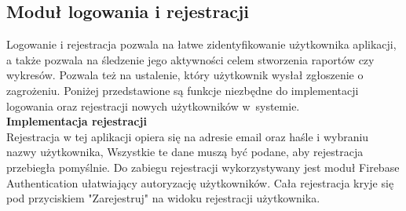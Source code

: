 \subsection{Moduł logowania i rejestracji}
Logowanie i rejestracja pozwala na łatwe zidentyfikowanie użytkownika aplikacji, a także pozwala na śledzenie jego aktywności celem stworzenia raportów czy wykresów. Pozwala też na ustalenie, który użytkownik wysłał zgłoszenie o zagrożeniu. Poniżej przedstawione są funkcje niezbędne do implementacji logowania oraz rejestracji nowych użytkowników w~systemie.
\\

\noindent
\textbf{Implementacja rejestracji}\\
\indent Rejestracja w tej aplikacji opiera się na adresie email oraz haśle i wybraniu nazwy użytkownika, Wszystkie te dane muszą być podane, aby rejestracja przebiegła pomyślnie. Do zabiegu rejestracji wykorzystywany jest moduł Firebase Authentication ułatwiający autoryzację użytkowników. Cała rejestracja kryje się pod przyciskiem "Zarejestruj" na widoku rejestracji użytkownika.\\
\noindent
\setlength{\fboxrule}{0.5pt}
\begin{minipage}{\linewidth}
    \label{lst:register}
    \centering
\end{minipage}
\\

